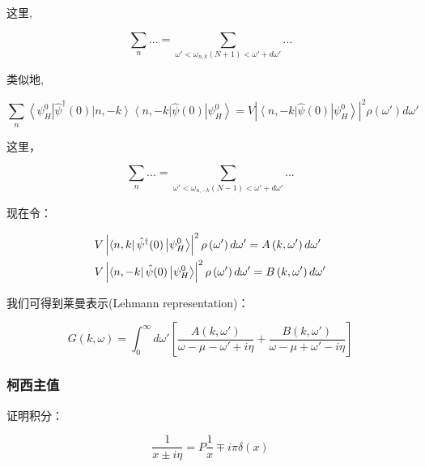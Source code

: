 这里,


\begin{equation*}
\sum_n ...= \sum_{\omega ' < \omega _{n,k} (N + 1) < \omega ' +
d\omega '} ...
\end{equation*}

类似地,

\[
\sum\limits_{n} {\left\langle {\psi _H^0 } \right|\hat \psi ^\dagger
(0)\left| {n, - k} \right\rangle \left\langle {n, - k} \right|\hat
\psi (0)\left| {\psi _H^0 } \right\rangle } = V\left| {\left\langle
{n, - k} \right|\hat \psi (0)\left| {\psi _H^0 } \right\rangle }
\right|^2 \rho \left( {\omega '} \right)d\omega '
\]

这里，

\[
\sum_n ...  = \sum_{\omega ' < \omega _{n, - k} (N - 1)  < \omega '
+ d\omega '} ...
\]

现在令：

\begin{equation}\label{spectral density}
\begin{gathered}
  V\left| {\left\langle {n,k} \right|\hat \psi ^\dagger (0)\left| {\psi _H^0 } \right\rangle } \right|^2 \rho \left( {\omega '} \right)d\omega ' = A\left( {k,\omega '} \right)d\omega ' \hfill \\
  V\left| {\left\langle {n, - k} \right|\hat \psi (0)\left| {\psi _H^0 } \right\rangle } \right|^2 \rho \left( {\omega '} \right)d\omega ' = B\left( {k,\omega '} \right)d\omega ' \hfill \\
\end{gathered}
\end{equation}

我们可得到莱曼表示(Lehmann representation)：

\begin{equation}\label{1D Fermion Lehmann representation}
G\left( {k,\omega } \right) = \int_0^\infty  {d\omega '\left[
{\frac{{A(k,\omega ')}} {{\omega  - \mu  - \omega ' + i\eta }} +
\frac{{B(k,\omega ')}} {{\omega  - \mu  + \omega ' - i\eta }}}
\right]}
\end{equation}

\subsubsection{柯西主值}

证明积分：

\begin{equation}
\frac{1}{x \pm i \eta} = P \frac{1}{x} \mp i \pi \delta (x)
\end{equation}

